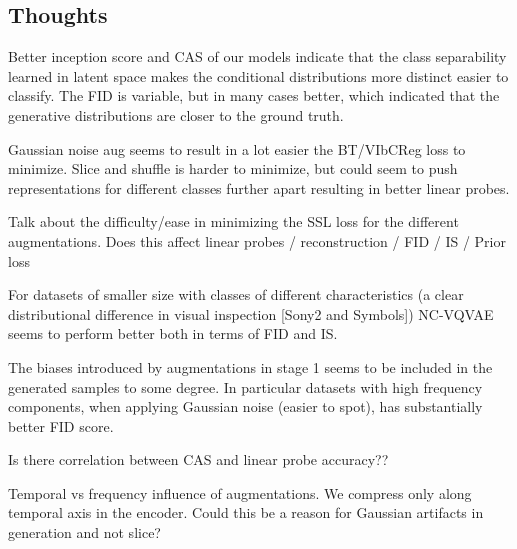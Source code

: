 \documentclass[../../thesis.tex]{subfiles}
\begin{document}
\subsection{Thoughts}

Better inception score and CAS of our models indicate that the class separability learned in latent space makes the conditional distributions more distinct easier to classify. The FID is variable, but in many cases better, which indicated that the generative distributions are closer to the ground truth.\newline

Gaussian noise aug seems to result in a lot easier the BT/VIbCReg loss to minimize. \newline
Slice and shuffle is harder to minimize, but could seem to push representations for different classes further apart resulting in better linear probes.\newline

Talk about the difficulty/ease in minimizing the SSL loss for the different augmentations. Does this affect linear probes / reconstruction / FID / IS / Prior loss
\newline



For datasets of smaller size with classes of different characteristics (a clear distributional difference in visual inspection [Sony2 and Symbols]) NC-VQVAE seems to perform better both in terms of FID and IS. \newline

The biases introduced by augmentations in stage 1 seems to be included in the generated samples to some degree. In particular datasets with high frequency components, when applying Gaussian noise (easier to spot), has substantially better FID score.  \newline

Is there correlation between CAS and linear probe accuracy?? \newline

Temporal vs frequency influence of augmentations. We compress only along temporal axis in the encoder. Could this be a reason for Gaussian artifacts in generation and not slice?\newline



\end{document}
